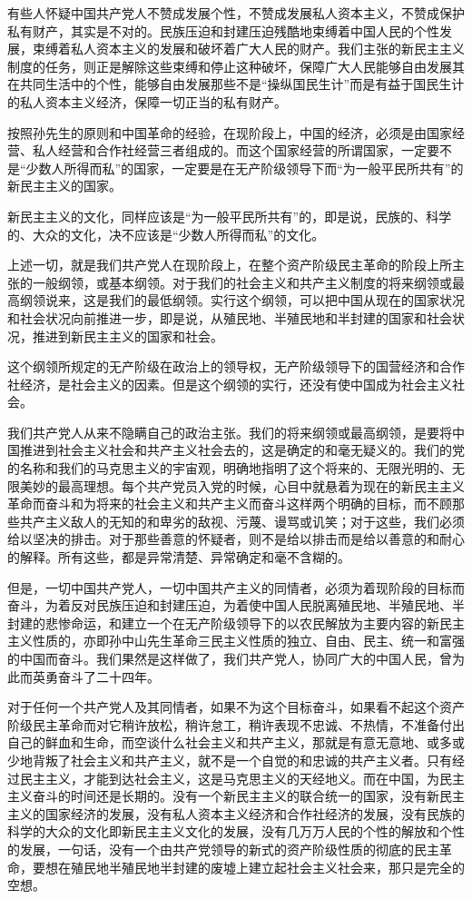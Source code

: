 有些人怀疑中国共产党人不赞成发展个性，不赞成发展私人资本主义，不赞成保护私有财产，其实是不对的。民族压迫和封建压迫残酷地束缚着中国人民的个性发展，束缚着私人资本主义的发展和破坏着广大人民的财产。我们主张的新民主主义制度的任务，则正是解除这些束缚和停止这种破坏，保障广大人民能够自由发展其在共同生活中的个性，能够自由发展那些不是“操纵国民生计”而是有益于国民生计的私人资本主义经济，保障一切正当的私有财产。

按照孙先生的原则和中国革命的经验，在现阶段上，中国的经济，必须是由国家经营、私人经营和合作社经营三者组成的。而这个国家经营的所谓国家，一定要不是“少数人所得而私”的国家，一定要是在无产阶级领导下而“为一般平民所共有”的新民主主义的国家。

新民主主义的文化，同样应该是“为一般平民所共有”的，即是说，民族的、科学的、大众的文化，决不应该是“少数人所得而私”的文化。

上述一切，就是我们共产党人在现阶段上，在整个资产阶级民主革命的阶段上所主张的一般纲领，或基本纲领。对于我们的社会主义和共产主义制度的将来纲领或最高纲领说来，这是我们的最低纲领。实行这个纲领，可以把中国从现在的国家状况和社会状况向前推进一步，即是说，从殖民地、半殖民地和半封建的国家和社会状况，推进到新民主主义的国家和社会。

这个纲领所规定的无产阶级在政治上的领导权，无产阶级领导下的国营经济和合作社经济，是社会主义的因素。但是这个纲领的实行，还没有使中国成为社会主义社会。

我们共产党人从来不隐瞒自己的政治主张。我们的将来纲领或最高纲领，是要将中国推进到社会主义社会和共产主义社会去的，这是确定的和毫无疑义的。我们的党的名称和我们的马克思主义的宇宙观，明确地指明了这个将来的、无限光明的、无限美妙的最高理想。每个共产党员入党的时候，心目中就悬着为现在的新民主主义革命而奋斗和为将来的社会主义和共产主义而奋斗这样两个明确的目标，而不顾那些共产主义敌人的无知的和卑劣的敌视、污蔑、谩骂或讥笑；对于这些，我们必须给以坚决的排击。对于那些善意的怀疑者，则不是给以排击而是给以善意的和耐心的解释。所有这些，都是异常清楚、异常确定和毫不含糊的。

但是，一切中国共产党人，一切中国共产主义的同情者，必须为着现阶段的目标而奋斗，为着反对民族压迫和封建压迫，为着使中国人民脱离殖民地、半殖民地、半封建的悲惨命运，和建立一个在无产阶级领导下的以农民解放为主要内容的新民主主义性质的，亦即孙中山先生革命三民主义性质的独立、自由、民主、统一和富强的中国而奋斗。我们果然是这样做了，我们共产党人，协同广大的中国人民，曾为此而英勇奋斗了二十四年。

对于任何一个共产党人及其同情者，如果不为这个目标奋斗，如果看不起这个资产阶级民主革命而对它稍许放松，稍许怠工，稍许表现不忠诚、不热情，不准备付出自己的鲜血和生命，而空谈什么社会主义和共产主义，那就是有意无意地、或多或少地背叛了社会主义和共产主义，就不是一个自觉的和忠诚的共产主义者。只有经过民主主义，才能到达社会主义，这是马克思主义的天经地义。而在中国，为民主主义奋斗的时间还是长期的。没有一个新民主主义的联合统一的国家，没有新民主主义的国家经济的发展，没有私人资本主义经济和合作社经济的发展，没有民族的科学的大众的文化即新民主主义文化的发展，没有几万万人民的个性的解放和个性的发展，一句话，没有一个由共产党领导的新式的资产阶级性质的彻底的民主革命，要想在殖民地半殖民地半封建的废墟上建立起社会主义社会来，那只是完全的空想。

